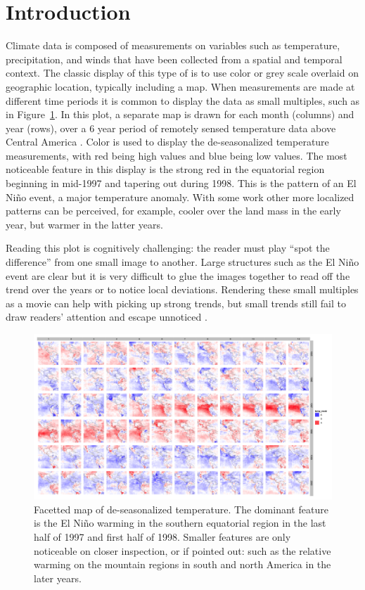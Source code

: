 \documentclass[oneside]{article}
\begin{document}
\section{Introduction}

Climate data is composed of measurements on variables such as temperature, precipitation, and winds that have been collected from a spatial and temporal context. The classic display of this type of is to use color or grey scale overlaid on geographic location, typically including a map. When measurements are made at different time periods it is common to display the data as small multiples, such as in Figure~\ref{fig:facetted-map}. In this plot, a separate map is drawn for each month (columns) and year (rows), over a 6 year period of remotely sensed temperature data above Central America \citet{murrell:2010}. Color is used to display the de-seasonalized temperature measurements, with red being high values and blue being low values. The most noticeable feature in this display is the strong red in the equatorial region beginning in mid-1997 and tapering out during 1998. This is the pattern of an El Ni\~no event, a major temperature anomaly. With some work other more localized patterns can be perceived, for example, cooler over the land mass in the early year, but warmer in the latter years. 

Reading this plot is cognitively challenging: the reader must play ``spot the difference'' from one small image to another. Large structures such as the El Ni\~no event are clear but it is very difficult to glue the images together to read off the trend over the years or to notice local deviations. Rendering these small multiples as a movie can help with picking up strong trends, but small trends still fail to draw readers' attention and escape unnoticed \citep{simons:gradual}.

\begin{figure}[htbp]
  \centering
  \includegraphics[width=5.5in]{nasa-colored-map.png}
  \caption{Facetted map of de-seasonalized temperature. The dominant feature is the El Ni\~no warming in the southern equatorial region in the last half of 1997 and first half of 1998. Smaller features are only noticeable on closer inspection, or if pointed out: such as the relative warming on the mountain regions in south and north America in the later years.}
  \label{fig:facetted-map}
\end{figure}
\end{document}
